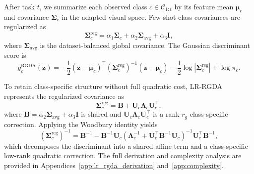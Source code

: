 After task $t$, we summarize each observed class $c\in\mathcal{C}_{1:t}$ by its feature mean $\boldsymbol{\mu}_c$ and covariance $\mathbf{\Sigma}_c$ in the adapted visual space. Few-shot class covariances are regularized as
\begin{equation}
    \mathbf{\Sigma}_c^{\mathrm{reg}}
    =\alpha_1\mathbf{\Sigma}_c
    +\alpha_2\mathbf{\Sigma}_{\mathrm{avg}}
    +\alpha_3\mathbf{I},
    \label{eq:cov_reg}
\end{equation}
where $\mathbf{\Sigma}_{\mathrm{avg}}$ is the dataset-balanced global covariance. The Gaussian discriminant score is
\begin{equation}
    g_c^{\mathrm{RGDA}}(\mathbf{z})
    =-\frac{1}{2}(\mathbf{z}-\boldsymbol{\mu}_c)^\top
      (\mathbf{\Sigma}_c^{\mathrm{reg}})^{-1}
      (\mathbf{z}-\boldsymbol{\mu}_c)
      -\frac{1}{2}\log|\mathbf{\Sigma}_c^{\mathrm{reg}}|+\log\pi_c.
    \label{eq:rgda}
\end{equation}

To retain class-specific structure without full quadratic cost, LR-RGDA represents the regularized covariance as
\begin{equation}
    \mathbf{\Sigma}_c^{\mathrm{reg}}
    =\mathbf{B}+\mathbf{U}_c\boldsymbol{\Lambda}_c\mathbf{U}_c^\top,
    \label{eq:lr_cov}
\end{equation}
where $\mathbf{B}=\alpha_2\mathbf{\Sigma}_{\mathrm{avg}}+\alpha_3\mathbf{I}$ is shared and $\mathbf{U}_c\boldsymbol{\Lambda}_c\mathbf{U}_c^\top$ is a rank-$r_g$ class-specific correction. Applying the Woodbury identity yields
\begin{equation}
    (\mathbf{\Sigma}_c^{\mathrm{reg}})^{-1}
    =\mathbf{B}^{-1}-\mathbf{B}^{-1}\mathbf{U}_c
      (\boldsymbol{\Lambda}_c^{-1}+\mathbf{U}_c^\top\mathbf{B}^{-1}\mathbf{U}_c)^{-1}
      \mathbf{U}_c^\top\mathbf{B}^{-1},
    \label{eq:woodbury}
\end{equation}
which decomposes the discriminant into a shared affine term and a class-specific low-rank quadratic correction. The full derivation and complexity analysis are provided in Appendices~\ref{app:lr_rgda_derivation} and~\ref{app:complexity}.

